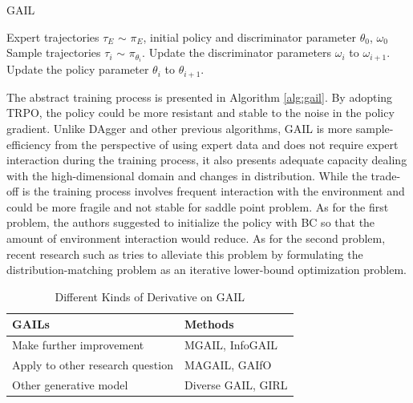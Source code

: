 \documentclass[acmsmall]{acmart}
\begin{document}
\begin{algorithm}[t]
  \caption{GAIL \protect\cite{hoGenerativeAdversarialImitation2016}}
  \label{alg:gail}
  \begin{algorithmic}
  \Require Expert trajectories $\tau_E$ $\sim$ $\pi_E$, initial policy and discriminator parameter $\theta_0$, $\omega_0$
        \State Sample trajectories $\tau_i$ $\sim$ $\pi_{\theta_i}$.
        \State Update the discriminator parameters $\omega_i$ to $\omega_{i+1}$.
        \State Update the policy parameter $\theta_i$ to $\theta_{i+1}$.
    \EndFor
  \end{algorithmic}
\end{algorithm}
The abstract training process is presented in Algorithm \ref{alg:gail}. By adopting TRPO, the policy could be more resistant and stable to the noise in the policy gradient. Unlike DAgger and other previous algorithms, GAIL is more sample-efficiency from the perspective of using expert data and does not require expert interaction during the training process, it also presents adequate capacity dealing with the high-dimensional domain and changes in distribution. While the trade-off is the training process involves frequent interaction with the environment and could be more fragile and not stable for saddle point problem. As for the first problem, the authors suggested to initialize the policy with BC so that the amount of environment interaction would reduce. As for the second problem, recent research such as\cite{arenzNonAdversarialImitationLearning2020} tries to alleviate this problem by formulating the distribution-matching problem as an iterative lower-bound optimization problem.

\begin{table}[t]
\caption{Different Kinds of Derivative on GAIL}
\label{table_gail}
\centering
\begin{tabular}{@{}ll@{}}
\toprule
GAILs & Methods \\ \midrule
Make further improvement & MGAIL\cite{baramEndtoEndDifferentiableAdversarial2017}, InfoGAIL\cite{liInfoGAILInterpretableImitation2017} \\ \midrule
Apply to other research question & MAGAIL\cite{songMultiAgentGenerativeAdversarial2018}, GAIfO\cite{torabiGenerativeAdversarialImitation2019}\\ \midrule
Other generative model & Diverse GAIL\cite{wangRobustImitationDiverse2017}, GIRL\cite{yu2020intrinsic} \\ \bottomrule
\end{tabular}
\end{table}
\end{document}
